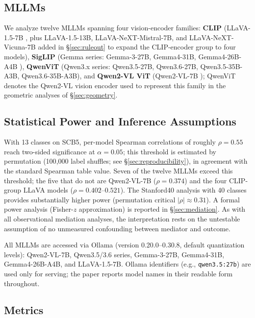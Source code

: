 \documentclass[a4paper,fleqn]{cas-sc}
\begin{document}
\subsection{MLLMs}

We analyze twelve MLLMs spanning four vision-encoder families: \textbf{CLIP} (LLaVA-1.5-7B \cite{liu2023visual}, plus LLaVA-1.5-13B, LLaVA-NeXT-Mistral-7B, and LLaVA-NeXT-Vicuna-7B added in \S\ref{sec:ruleout} to expand the CLIP-encoder group to four models), \textbf{SigLIP} (Gemma series: Gemma-3-27B, Gemma4-31B, Gemma4-26B-A4B \cite{team2025gemma3, team2025gemma4}), \textbf{QwenViT} (Qwen3.x series: Qwen3.5-27B, Qwen3.6-27B, Qwen3.5-35B-A3B, Qwen3.6-35B-A3B), and \textbf{Qwen2-VL ViT} (Qwen2-VL-7B \cite{wang2024qwen2vl}); QwenViT denotes the Qwen2-VL vision encoder \cite{wang2024qwen2vl} used to represent this family in the geometric analyses of \S\ref{sec:geometry}.

\subsection{Statistical Power and Inference Assumptions}

With 13 classes on SCB5, per-model Spearman correlations of roughly $\rho=0.55$ reach two-sided significance at $\alpha=0.05$; this threshold is estimated by permutation (100{,}000 label shuffles; see \S\ref{sec:reproducibility}), in agreement with the standard Spearman table value. Seven of the twelve MLLMs exceed this threshold; the five that do not are Qwen2-VL-7B ($\rho=0.374$) and the four CLIP-group LLaVA models ($\rho=0.402$--$0.521$). The Stanford40 analysis with 40 classes provides substantially higher power (permutation critical $|\rho|\approx0.31$). A formal power analysis (Fisher-$z$ approximation) is reported in \S\ref{sec:mediation}. As with all observational mediation analyses, the interpretation rests on the untestable assumption of no unmeasured confounding between mediator and outcome.

All MLLMs are accessed via Ollama (version 0.20.0--0.30.8, default quantization levels): Qwen2-VL-7B, Qwen3.5/3.6 series, Gemma-3-27B, Gemma4-31B, Gemma4-26B-A4B, and LLaVA-1.5-7B. Ollama identifiers (e.g., \texttt{qwen3.5:27b}) are used only for serving; the paper reports model names in their readable form throughout.

\subsection{Metrics}
\end{document}
